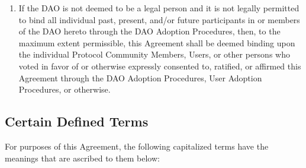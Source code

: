 \documentclass{article}
\begin{document}
\begin{enumerate}[label=\Alph*.]
\begin{enumerate}
              \item If the DAO is not deemed to be a legal person and it is not legally permitted to bind all individual past, present, and/or future participants in or members of the DAO hereto through the DAO Adoption Procedures, then, to the maximum extent permissible, this Agreement shall be deemed binding upon the individual Protocol Community Members, Users, or other persons who voted in favor of or otherwise expressly consented to, ratified, or affirmed this Agreement through the DAO Adoption Procedures, User Adoption Procedures, or otherwise.

          \end{enumerate}
\end{enumerate}

\subsection{Certain Defined Terms}\label{subsec:defined_terms_1}

For purposes of this Agreement, the following capitalized terms have the meanings that are ascribed to them below:
\end{document}
